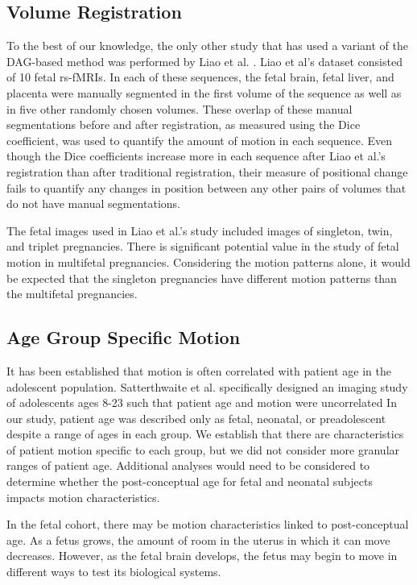\subsection{Volume Registration} 

To the best of our knowledge, the only other study that has used a variant of the DAG-based method was performed by Liao et al. \cite{Liao2016}. Liao et al’s dataset consisted of 10 fetal rs-fMRIs. In each of these sequences, the fetal brain, fetal liver, and placenta were manually segmented in the first volume of the sequence as well as in five other randomly chosen volumes. These overlap of these manual segmentations before and after registration, as measured using the Dice coefficient, was used to quantify the amount of motion in each sequence. Even though the Dice coefficients increase more in each sequence after Liao et al.’s registration than after traditional registration, their measure of positional change fails to quantify any changes in position between any other pairs of volumes that do not have manual segmentations. 

The fetal images used in Liao et al.'s study included images of singleton, twin, and triplet pregnancies. There is significant potential value in the study of fetal motion in multifetal pregnancies. Considering the motion patterns alone, it would be expected that the singleton pregnancies have different motion patterns than the multifetal pregnancies.

\subsection{Age Group Specific Motion}

It has been established that motion is often correlated with patient age in the adolescent population. Satterthwaite et al. specifically designed an imaging study of adolescents ages 8-23 such that patient age and motion were uncorrelated \cite{Satterthwaite2012} %
In our study, patient age was described only as fetal, neonatal, or preadolescent despite a range of ages in each group. We establish that there are characteristics of patient motion specific to each group, but we did not consider more granular ranges of patient age. Additional analyses would need to be considered to determine whether the post-conceptual age for fetal and neonatal subjects impacts motion characteristics. 

In the fetal cohort, there may be motion characteristics linked to post-conceptual age. As a fetus grows, the amount of room in the uterus in which it can move decreases. However, as the fetal brain develops, the fetus may begin to move in different ways to test its biological systems. 

